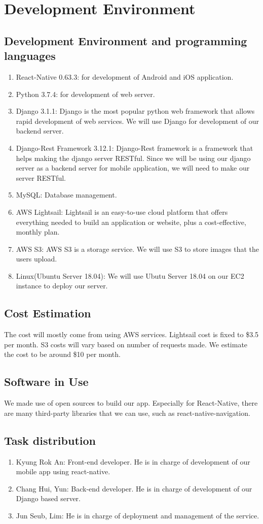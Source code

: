 \documentclass[conference]{IEEEtran}
\begin{document}
\section{Development Environment}
\subsection{Development Environment and programming languages}
\begin{enumerate}
    \item React-Native 0.63.3: for development of Android and iOS application.
    \item Python 3.7.4: for development of web server.
    \item Django 3.1.1: Django is the most popular python web framework that allows rapid development of web services. We will use Django for development of our backend server.
    \item Django-Rest Framework 3.12.1: Django-Rest framework is a framework that helps making the django server RESTful. Since we will be using our django server as a backend server for mobile application, we will need to make our server RESTful.
    \item MySQL: Database management.
    \item AWS Lightsail: Lightsail is an easy-to-use cloud platform that offers everything needed to build an application or website, plus a cost-effective, monthly plan. 
    \item AWS S3: AWS S3 is a storage service. We will use S3 to store images that the users upload.
    \item Linux(Ubuntu Server 18.04): We will use Ubutu Server 18.04 on our EC2 instance to deploy our server.
\end{enumerate} 
\subsection{Cost Estimation}
The cost will mostly come from using AWS services. Lightsail cost is fixed to \$3.5 per month. S3 costs will vary based on number of requests made. We estimate the cost to be around \$10 per month.
\subsection{Software in Use}
We made use of open sources to build our app. Especially for React-Native, there are many third-party libraries that we can use, such as react-native-navigation.   
\subsection{Task distribution}
\begin{enumerate}
    \item Kyung Rok An: Front-end developer. He is in charge of development of our mobile app using react-native.
    \item Chang Hui, Yun: Back-end developer. He is in charge of development of our Django based server.
    \item Jun Seub, Lim: He is in charge of deployment and management of the service.
\end{enumerate}
\end{document}
